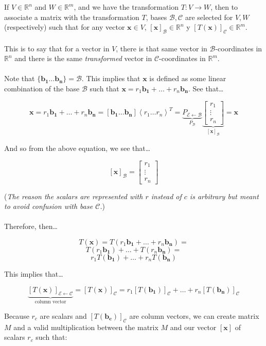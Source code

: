 \documentclass[12pt]{article}
\newcommand{\R}{\mathbb{R}}
\newcommand{\bm}[1]{\mathbf{{#1}}}
\newcommand{\mb}{\begin{bmatrix}}
\newcommand{\me}{\end{bmatrix}}
\newcommand{\vecbrac}[1]{\left\langle{#1}\right\rangle}
\newcommand{\mmc}[1]{\mathcal{{#1}}}
\newcommand{\set}[1]{\{{#1}\}}
\begin{document}
If $V \in \R^n$ and $W \in \R^m$, and we have the transformation $T: V \rightarrow W$, then to associate a matrix with
the transformation $T$, bases $\mmc{B, C}$ are selected for $V, W$ (respectively) such that for any vector $\bm{x} \in V$,
$[\bm{x}]_\mmc{B} \in \R^n$ y $[T(\bm{x})]_\mmc{C} \in \R^m$. \\ \\

This is to say that for a vector in $V$, there is that same vector in $\mmc{B}$-coordinates in $\R^n$ and there is the same \emph{transformed}
vector in $\mmc{C}$-coordinates in $\R^m$. \\ \\

Note that $\set{\bm{b_1 \dots b_n}} = \mmc{B}$. This implies that $\bm{x}$ is defined as some linear combination of the base $\mmc{B}$ such that $\bm{x} = r_1\bm{b_1} + \dots + r_n\bm{b_n}$. See that\dots

$$\bm{x} = r_1\bm{b_1} + \dots + r_n\bm{b_n} = [\bm{b_1 \dots b_n}] \vecbrac{r_1 \dots r_n}^T = \underbrace{P_\mmc{E \leftarrow B}}_{P_\mmc{B}} \underbrace{\mb r_1 \\ \vdots \\ r_n \me}_{\bm{[x]}_\mmc{B}} = \bm{x}$$

And so from the above equation, we see that\dots

$$[\bm{x}]_\mmc{B} = \mb r_1 \\ \vdots \\ r_n \me$$

(\emph{The reason the scalars are represented with $r$ instead of $c$ is arbitrary but meant to avoid confusion with base $\mmc{C}$.}) \\ \\

Therefore, then\dots

$$T(\bm{x}) = T(r_1\bm{b_1} + \dots + r_n\bm{b_n}) =$$
$$T(r_1\bm{b_1}) + \dots + T(r_n\bm{b_n}) =$$
$$r_1T(\bm{b_1}) + \dots + r_nT(\bm{b_n})$$

This implies that\dots

$$\underbrace{[T(\bm{x})]_\mmc{E \leftarrow C}}_{\textrm{column vector}} = [T(\bm{x})]_\mmc{C} = r_1[T(\bm{b_1})]_\mmc{C} + \dots + r_n[T(\bm{b_n})]_\mmc{C}$$

Because $r_c$ are scalars and $[T(\bm{b_c})]_\mmc{C}$ are column vectors, we can create matrix $M$ and a valid multiplication between
the matrix $M$ and our vector $[\bm{x}]$ of scalars $r_c$ such that:
\end{document}
